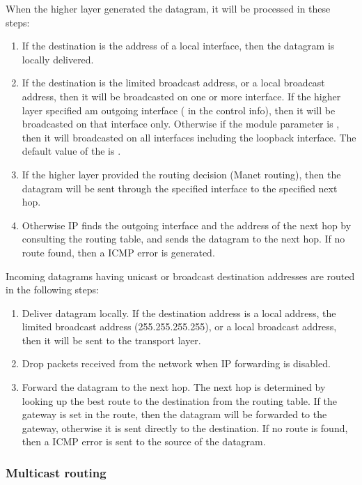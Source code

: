 When the higher layer generated the datagram, it will be processed
in these steps:
\begin{enumerate}
  \item If the destination is the address of a local interface,
  then the datagram is locally delivered.
  \item If the destination is the limited broadcast address, or a
  local broadcast address, then it will be broadcasted on one or more
  interface. If the higher layer specified am outgoing interface
  ( in the control info), then it will be broadcasted
  on that interface only. Otherwise if the  module
  parameter is , then it will broadcasted on all interfaces
  including the loopback interface. The default value of the
   is .
  \item If the higher layer provided the routing decision (Manet routing),
  then the datagram will be sent through the specified interface to the
  specified next hop.
  \item Otherwise IP finds the outgoing interface and the address of the
  next hop by consulting the routing table, and sends the datagram
  to the next hop. If no route
  found, then a  ICMP error is generated.
\end{enumerate}


Incoming datagrams having unicast or broadcast destination addresses are
routed in the following steps:

\begin{enumerate}
  \item Deliver datagram locally. If the destination address is a local
  address, the limited broadcast address (255.255.255.255), or a local
  broadcast address, then it will be sent to the transport layer.
  \item Drop packets received from the network when IP forwarding is disabled.
  \item Forward the datagram to the next hop. The next hop is
    determined by looking up the best route to the destination from the
    routing table. If the gateway is set in the route, then the datagram
    will be forwarded to the gateway, otherwise it is sent directly to the
    destination. If no route is found, then
    a  ICMP error is sent to the source of the
    datagram.
\end{enumerate}

\subsubsection*{Multicast routing}


